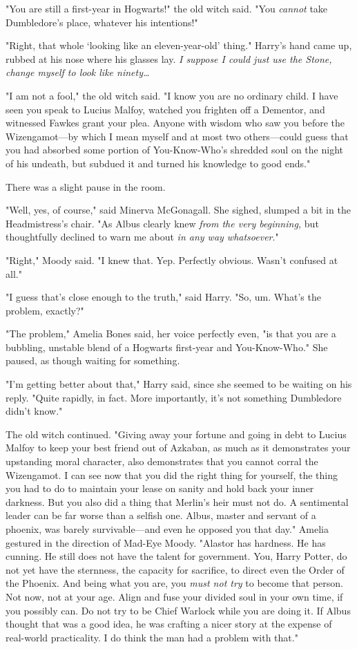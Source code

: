 "You are still a first-year in Hogwarts!" the old witch said. "You
\emph{cannot} take Dumbledore's place, whatever his intentions!"

"Right, that whole `looking like an eleven-year-old' thing." Harry's hand came
up, rubbed at his nose where his glasses lay. \emph{I suppose I could just use
the Stone, change myself to look like ninety{\ldots}}

"I am not a fool," the old witch said. "I know you are no ordinary child. I
have seen you speak to Lucius Malfoy, watched you frighten off a Dementor, and
witnessed Fawkes grant your plea. Anyone with wisdom who saw you before the
Wizengamot---by which I mean myself and at most two others---could guess that
you had absorbed some portion of You-Know-Who's shredded soul on the night of
his undeath, but subdued it and turned his knowledge to good ends."

There was a slight pause in the room.

"Well, yes, of course," said Minerva McGonagall. She sighed, slumped a bit in
the Headmistress's chair. "As Albus clearly knew \emph{from the very
beginning,} but thoughtfully declined to warn me about \emph{in any way
whatsoever}."

"Right," Moody said. "I knew that. Yep. Perfectly obvious. Wasn't confused at
all."

"I guess that's close enough to the truth," said Harry. "So, um. What's the
problem, exactly?"

"The problem," Amelia Bones said, her voice perfectly even, "is that you are a
bubbling, unstable blend of a Hogwarts first-year and You-Know-Who." She
paused, as though waiting for something.

"I'm getting better about that," Harry said, since she seemed to be waiting on
his reply. "Quite rapidly, in fact. More importantly, it's not something
Dumbledore didn't know."

The old witch continued. "Giving away your fortune and going in debt to Lucius
Malfoy to keep your best friend out of Azkaban, as much as it demonstrates your
upstanding moral character, also demonstrates that you cannot corral the
Wizengamot. I can see now that you did the right thing for yourself, the thing
you had to do to maintain your lease on sanity and hold back your inner
darkness. But you also did a thing that Merlin's heir must not do. A
sentimental leader can be far worse than a selfish one. Albus, master and
servant of a phoenix, was barely survivable---and even he opposed you that
day." Amelia gestured in the direction of Mad-Eye Moody. "Alastor has hardness.
He has cunning. He still does not have the talent for government. You, Harry
Potter, do not yet have the sternness, the capacity for sacrifice, to direct
even the Order of the Phoenix. And being what you are, you \emph{must not try}
to become that person. Not now, not at your age. Align and fuse your divided
soul in your own time, if you possibly can. Do not try to be Chief Warlock
while you are doing it. If Albus thought that was a good idea, he was crafting
a nicer story at the expense of real-world practicality. I do think the man had
a problem with that."


